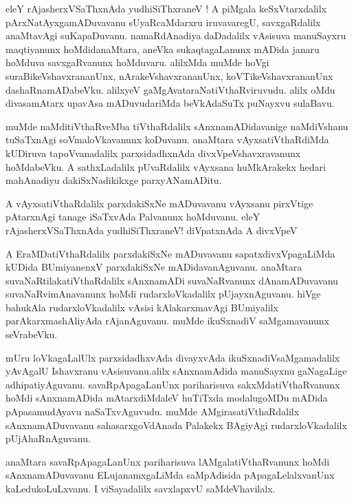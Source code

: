 \documentclass{article}
\begin{document}
\begin{mn}
eleY rAjasherxVSaThxnAda yudhiSiThxraneV ! A piMgala keSxVtarxdalilx pArxNatAyxgamADuvavanu 
sUyaRcaMdarxru iruvavaregU, savxgaRdalilx anaMtavAgi suKapaDuvanu. namaRdAnadiya daDadalilx 
vAsisuva manuSayxru maqtiyanunx hoMdidanaMtara, aneVka sukaqtagaLanunx  mADida janaru hoMduva 
savxgaRvanunx hoMduvaru. alilxMda muMde hoVgi  suraBikeVshavxrananUnx, nArakeVshavxrananUnx, 
koVTikeVshavxrananUnx dashaRnamADabeVku. alilxyeV gaMgAvataraNatiVthaRviruvudu. 
alilx oMdu divasamAtarx upavAsa mADuvudariMda beVkAdaSuTx puNayxvu sulaBavu.
\end{mn}

\begin{mn}
muMde naMditiVthaRveMba tiVthaRdalilx sAnxnamADidavanige naMdiVshanu tuSaTxnAgi soVmaloVkavanunx
koDuvanu. anaMtara vAyxsatiVthaRdiMda kUDiruva tapoVvanadalilx parxsidadhxnAda divxVpeVshavxravanunx
hoMdabeVku. A sathxLadalilx pUvaRdalilx vAyxsana huMkArakekx hedari mahAnadiyu dakiSxNadikikxge 
parxyANamADitu.
\end{mn}

\begin{mn}
A vAyxsatiVthaRdalilx parxdakiSxNe mADuvavanu vAyxsanu pirxVtige pAtarxnAgi tanage iSaTxvAda 
Palvanunx hoMduvanu. eleY rAjasherxVSaThxnAda yudhiSiThxraneV! diVpatxnAda A divxVpeV
\end{mn}

\begin{mn}
A EraMDatiVthaRdalilx parxdakiSxNe mADuvavanu sapatxdivxVpagaLiMda kUDida BUmiyanenxV parxdakiSxNe
mADidavanAguvanu. anaMtara suvaNaRtilakatiVthaRdalilx sAnxnamADi suvaNaRvanunx dAnamADuvavanu 
suvaNaRvimAnavanunx hoMdi rudarxloVkadalilx pUjayxnAguvanu. hiVge bahukAla rudarxloVkadalilx
vAsisi kAlakarxmavAgi BUmiyalilx parAkarxmashAliyAda rAjanAguvanu. muMde ikuSxnadiV saMgamavanunx 
seVrabeVku.
\end{mn}

\begin{mn}
mUru loVkagaLalUlx parxsidadhxvAda divayxvAda ikuSxnadiVsaMgamadalilx yAvAgalU Ishavxranu 
vAsisuvanu.alilx sAnxnamAdida manuSayxnu gaNagaLige adhipatiyAguvanu. savaRpApagaLanUnx 
pariharisuva 
sakxMdatiVthaRvanunx hoMdi sAnxnamADida mAtarxdiMdaleV huTiTxda modalugoMDu 
mADida pApasamudAyavu naSaTxvAguvudu. muMde AMgirasatiVthaRdalilx sAnxnamADuvavanu sahasarxgoVdAnada
Palakekx BAgiyAgi rudarxloVkadalilx pUjAhaRnAguvanu.
\end{mn}

\begin{mn}
anaMtara savaRpApagaLanUnx pariharisuva lAMgalatiVthaRvanunx hoMdi sAnxnamADuvavanu 
ELujanamxgaLiMda saMpAdisida pApagaLelalxvanUnx kaLedukoLuLxvanu. I viSayadalilx savxlapxvU
saMdeVhavilalx.
\end{mn}
\end{document}

